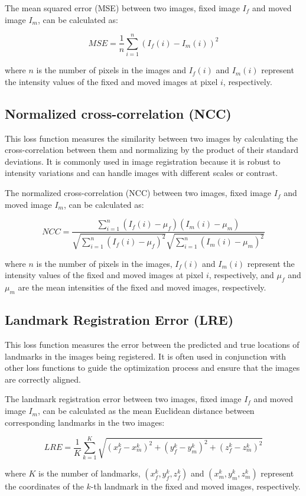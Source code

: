 \documentclass{book}
\begin{document}
	The mean squared error (MSE) between two images, fixed image $I_f$ and moved image $I_m$, can be calculated as:
	
	$$ MSE = \frac{1}{n} \sum_{i=1}^n (I_f(i) - I_m(i))^2 $$
	
	where $n$ is the number of pixels in the images and $I_f(i)$ and $I_m(i)$ represent the intensity values of the fixed and moved images at pixel $i$, respectively.
	
	\subsection{Normalized cross-correlation (NCC)}
	This loss function measures the similarity between two images by calculating the cross-correlation between them and normalizing by the product of their standard deviations. It is commonly used in image registration because it is robust to intensity variations and can handle images with different scales or contrast.
	
	
	The normalized cross-correlation (NCC) between two images, fixed image $I_f$ and moved image $I_m$, can be calculated as:
	
	$$ NCC = \frac{\sum_{i=1}^n (I_f(i) - \mu_f)(I_m(i) - \mu_m)}{\sqrt{\sum_{i=1}^n (I_f(i) - \mu_f)^2}\sqrt{\sum_{i=1}^n (I_m(i) - \mu_m)^2}} $$
	
	where $n$ is the number of pixels in the images, $I_f(i)$ and $I_m(i)$ represent the intensity values of the fixed and moved images at pixel $i$, respectively, and $\mu_f$ and $\mu_m$ are the mean intensities of the fixed and moved images, respectively.
	
	\subsection{Landmark Registration Error (LRE)}
	This loss function measures the error between the predicted and true locations of landmarks in the images being registered. It is often used in conjunction with other loss functions to guide the optimization process and ensure that the images are correctly aligned.
	
	The landmark registration error between two images, fixed image $I_f$ and moved image $I_m$, can be calculated as the mean Euclidean distance between corresponding landmarks in the two images:
	
	$$ LRE = \frac{1}{K} \sum_{k=1}^K \sqrt{(x_f^k - x_m^k)^2 + (y_f^k - y_m^k)^2 + (z_f^k - z_m^k)^2} $$
	
	where $K$ is the number of landmarks, $(x_f^k, y_f^k, z_f^k)$ and $(x_m^k, y_m^k, z_m^k)$ represent the coordinates of the $k$-th landmark in the fixed and moved images, respectively.
	
\end{document}
